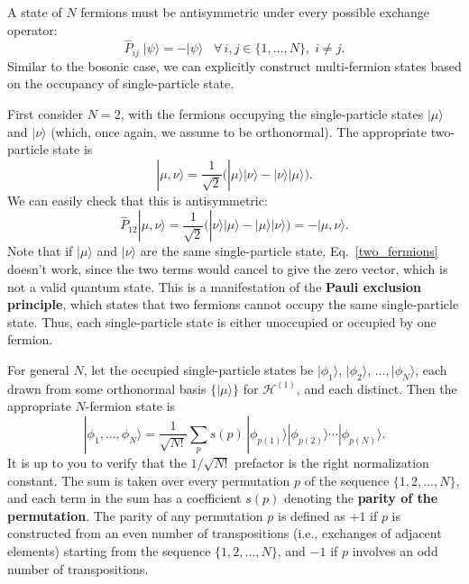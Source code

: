 \documentclass[pra,12pt]{revtex4}
\begin{document}
A state of $N$ fermions must be antisymmetric under every possible
exchange operator:
\begin{equation}
  \hat{P}_{ij}\; |\psi\rangle = -|\psi\rangle \;\;\; \forall\, i,j\in\{1,\dots,N\}, \; i\ne j.
\end{equation}
Similar to the bosonic case, we can explicitly construct multi-fermion
states based on the occupancy of single-particle state.

First consider $N=2$, with the fermions occupying the single-particle
states $|\mu\rangle$ and $|\nu\rangle$ (which, once again, we assume
to be orthonormal).  The appropriate two-particle state is
\begin{equation}
  |\mu,\nu\rangle = \frac{1}{\sqrt{2}}
  \Big(|\mu\rangle|\nu\rangle - |\nu\rangle|\mu\rangle\Big).
  \label{two_fermions}
\end{equation}
We can easily check that this is antisymmetric:
\begin{equation}
  \hat{P}_{12} |\mu,\nu\rangle = \frac{1}{\sqrt{2}}
  \Big(|\nu\rangle|\mu\rangle - |\mu\rangle|\nu\rangle\Big)
  = - |\mu,\nu\rangle.
\end{equation}
Note that if $|\mu\rangle$ and $|\nu\rangle$ are the same
single-particle state, Eq.~\eqref{two_fermions} doesn't work, since
the two terms would cancel to give the zero vector, which is not a
valid quantum state.  This is a manifestation of the \textbf{Pauli
  exclusion principle}, which states that two fermions cannot occupy
the same single-particle state.  Thus, each single-particle state is
either unoccupied or occupied by one fermion.

For general $N$, let the occupied single-particle states be
$|\phi_1\rangle$, $|\phi_2\rangle$, $\dots, |\phi_N\rangle$, each
drawn from some orthonormal basis $\{|\mu\rangle\}$ for
$\mathscr{H}^{(1)}$, and each distinct.  Then the appropriate
$N$-fermion state is
\begin{equation}
  |\phi_1,\dots,\phi_N\rangle = \frac{1}{\sqrt{N!}} \sum_p s(p)\, |\phi_{p(1)}\rangle |\phi_{p(2)}\rangle \cdots |\phi_{p(N)}\rangle.
  \label{Nfermions}
\end{equation}
It is up to you to verify that the $1/\sqrt{N!}$ prefactor is the
right normalization constant.  The sum is taken over every permutation
$p$ of the sequence $\{1,2,\dots,N\}$, and each term in the sum has a
coefficient $s(p)$ denoting the \textbf{parity of the permutation}.
The parity of any permutation $p$ is defined as $+1$ if $p$ is
constructed from an even number of transpositions (i.e., exchanges of
adjacent elements) starting from the sequence $\{1,2,\dots,N\}$, and
$-1$ if $p$ involves an odd number of transpositions.
\end{document}
